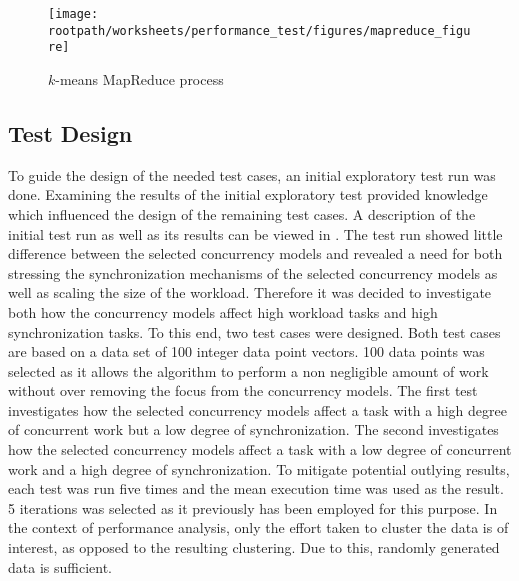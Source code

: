 \begin{figure}
\centering
\texttt{[image: \\rootpath/worksheets/performance\_test/figures/mapreduce\_figure]}
\caption{$k$-means MapReduce process}\label{fig:kmeans_mapreduce}
\end{figure}



\subsection{Test Design}
To guide the design of the needed test cases, an initial exploratory test run was done. Examining the results of the initial exploratory test provided knowledge which influenced the design of the remaining test cases. A description of the initial test run as well as its results can be viewed in . The test run showed little difference between the selected concurrency models and revealed a need for both stressing the synchronization mechanisms of the selected concurrency models as well as scaling the size of the workload. Therefore it was decided to investigate both how the concurrency models affect high workload tasks and high synchronization tasks. To this end, two test cases were designed. Both test cases are based on a data set of 100 integer data point vectors. 100 data points was selected as it allows the algorithm to perform a non negligible amount of work without over removing the focus from the concurrency models. The first test investigates how the selected concurrency models affect a task with a high degree of concurrent work but a low degree of synchronization. The second investigates how the selected concurrency models affect a task with a low degree of concurrent work and a high degree of synchronization. To mitigate potential outlying results, each test was run five times and the mean execution time was used as the result. 5 iterations was selected as it previously has been employed for this purpose\cite{tardieu2014x10}.  In the context of performance analysis, only the effort taken to cluster the data is of interest, as opposed to the resulting clustering. Due to this, randomly generated data is sufficient.


